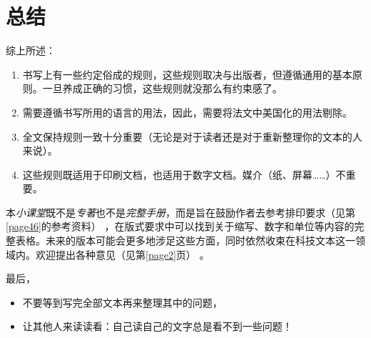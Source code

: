 \chapter{总结}

综上所述：

\begin{enumerate}
    \item 书写上有一些约定俗成的规则，这些规则取决与出版者，但遵循通用的基本原则。一旦养成正确的习惯，这些规则就没那么有约束感了。
    \item 需要遵循书写所用的语言的用法，因此，需要将法文中美国化的用法剔除。
    \item 全文保持规则一致十分重要（无论是对于读者还是对于重新整理你的文本的人来说）。
    \item 这些规则既适用于印刷文档，也适用于数字文档。媒介（纸、屏幕……\nolinebreak）不重要。
\end{enumerate}

本\emph{小课堂}既不是\emph{专著}也不是\emph{完整手册}，而是旨在鼓励作者去参考排印要求（见第\ref{page46}的参考资料）%
，在版式要求中可以找到关于缩写、数字和单位等内容的完整表格。未来的版本可能会更多地涉足这些方面，同时依然收束在科技文本这一领域内。欢迎提出各种意见（见第\ref{page2}页）%
。

最后，
\begin{itemize}
    \item 不要等到写完全部文本再来整理其中的问题，
    \item 让其他人来读读看：自己读自己的文字总是看不到一些问题！
\end{itemize}